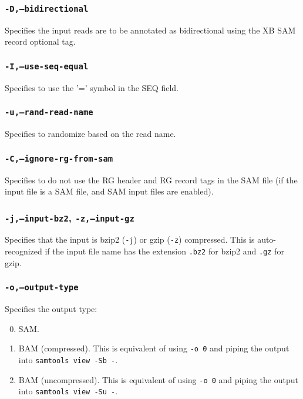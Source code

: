 \documentclass[a4paper,12pt]{book}
\newcommand{\TT}[1]{{\tt #1}} %
\begin{document}
\subsubsection{\TT{-D,--bidirectional}}
Specifies the input reads are to be annotated as bidirectional using the XB SAM record optional tag.

\subsubsection{\TT{-I,--use-seq-equal}}
Specifies to use the '=' symbol in the SEQ field.

\subsubsection{\TT{-u,--rand-read-name}}
Specifies to randomize based on the read name.

\subsubsection{\TT{-C,--ignore-rg-from-sam}}
Specifies to do not use the RG header and RG record tags in the SAM file (if the input file is a SAM file, and SAM input files are enabled).

\subsubsection{\TT{-j,--input-bz2}, \TT{-z,--input-gz}}
Specifies that the input is bzip2 (\TT{-j}) or gzip (\TT{-z}) compressed.
This is auto-recognized if the input file name has the extension \TT{.bz2} for bzip2 and \TT{.gz} for gzip.

\subsubsection{\TT{-o,--output-type}}
Specifies the output type:
\begin{enumerate}
	\setcounter{enumi}{-1} %
	\item SAM.
	\item BAM (compressed). This is equivalent of using \TT{-o 0} and piping the output into \TT{samtools view -Sb -}.
	\item BAM (uncompressed). This is equivalent of using \TT{-o 0} and piping the output into \TT{samtools view -Su -}.
\end{enumerate}
\end{document}
